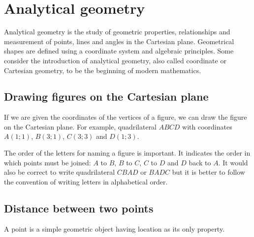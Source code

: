 \chapter{Analytical geometry}
Analytical geometry is the study of geometric properties, relationships and measurement of points, lines and angles in the Cartesian plane. Geometrical shapes are defined using a coordinate system and algebraic principles. Some consider the introduction of analytical geometry, also called coordinate or Cartesian geometry, to be the beginning of modern mathematics.\par 

\section{Drawing figures on the Cartesian plane}
If we are given the coordinates of the vertices of a figure, we can draw the figure on the Cartesian plane. For example, quadrilateral $ABCD$ with coordinates $A(1;1)$, $B(3;1)$, $C(3;3)$ and $D(1;3)$.  

\setcounter{subfigure}{0}
\begin{figure}[H] %
\begin{center}
\end{center}
\label{fig:cartesianplane}
\end{figure} 

The order of the letters for naming a figure is important. It indicates the order in which points must be joined: $A$ to $B$, $B$ to $C$, $C$ to $D$ and $D$ back to $A$. It would also be correct to write quadrilateral $CBAD$ or $BADC$ but it is better to follow the convention of writing letters in alphabetical order.     

\section{Distance between two points}
A point is a simple geometric object having location as its only property. 

